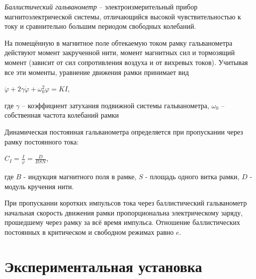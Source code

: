 \documentclass[a4paper]{article}
\begin{document}
\textit{Баллистический гальванометр} -- электроизмерительный прибор магнитоэлектрической системы, отличающийся высокой чувствительностью к току и сравнительно большим периодом свободных колебаний. \par
На помещённую в магнитное поле обтекаемую током рамку гальванометра действуют момент закрученной нити, момент магнитных сил и тормозящий момент (зависит от сил сопротивления воздуха и от вихревых токов). Учитывая все эти моменты, уравнение движения рамки принимает вид
\begin{center}
    $\ddot \varphi + 2 \gamma \dot \varphi + \omega_0^2\varphi = KI $,
\end{center}
где $\gamma$ -- коэффициент затухания подвижной системы гальванометра, $\omega_0$ -- собственная частота колебаний рамки

Динамическая постоянная гальванометра определяется при пропускании через рамку постоянного тока:
\begin{center}
    $C_I = \frac{I}{\varphi} = \frac{D}{BSN}$,
\end{center}
где $B$ - индукция магнитного поля в рамке, $S$ - площадь одного витка рамки, $D$ - модуль кручения нити. \par
При пропускании коротких импульсов тока через баллистический гальванометр начальная скорость движения рамки пропорциональна электрическому заряду, прошедшему через рамку за всё время импульса. Отношение баллистических постоянных в критическом и свободном режимах равно $e$.

\section{Экспериментальная установка}
\end{document}
